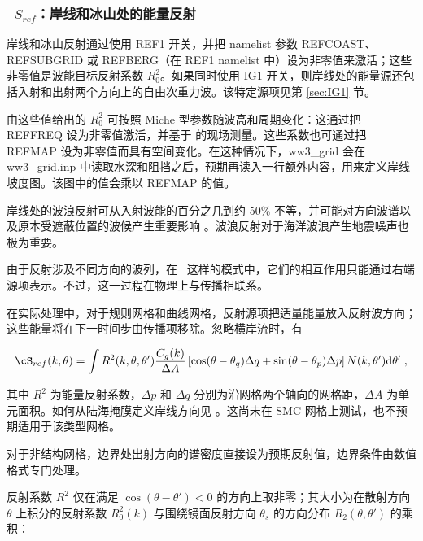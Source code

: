 \vsssub
\subsubsection{~$S_{ref}$：岸线和冰山处的能量反射} \label{sec:REF1}
\vsssub


\noindent 
岸线和冰山反射通过使用 {\code REF1} 开关，并把 namelist 参数 {\code REFCOAST}、{\code REFSUBGRID} 或 {\code REFBERG}（在 {\F REF1} namelist 中）设为非零值来激活；这些非零值是波能目标反射系数 $R_0^2$。如果同时使用 {\code IG1} 开关，则岸线处的能量源还包括入射和出射两个方向上的自由次重力波。该特定源项见第 \ref{sec:IG1} 节。

由这些值给出的 $R_0^2$ 可按照 Miche 型参数随波高和周期变化：这通过把 {\code REFFREQ} 设为非零值激活，并基于 \cite{art:EHG94} 的现场测量。这些系数也可通过把 {\code REFMAP} 设为非零值而具有空间变化。在这种情况下，ww3\_grid 会在 ww3\_grid.inp 中读取水深和阻挡之后，预期再读入一行额外内容，用来定义岸线坡度图。该图中的值会乘以 {\code REFMAP} 的值。

岸线处的波浪反射可从入射波能的百分之几到约 50\% 不等，并可能对方向波谱以及原本受遮蔽位置的波候产生重要影响 \citep{pro:ORe99}。波浪反射对于海洋波浪产生地震噪声也极为重要。

由于反射涉及不同方向的波列，在 \ws\ 这样的模式中，它们的相互作用只能通过右端源项表示。不过，这一过程在物理上与传播相联系。

在实际处理中，对于规则网格和曲线网格，反射源项把适量能量放入反射波方向；这些能量将在下一时间步由传播项移除。忽略横岸流时，有

\begin{equation} 
\cS_{ref}(k,\theta) = 
\int R^2(k,\theta,\theta') \frac{C_g(k)}{\Delta A} \left[\cos (\theta-\theta_q) \Delta q + \sin (\theta-\theta_p)  \Delta p \right] N(k,\theta') \mathrm{d} \theta' \; ,
\end{equation}

\noindent
其中 $R^2$ 为能量反射系数，$\Delta p$ 和 $\Delta q$ 分别为沿网格两个轴向的网格距，$\Delta A$ 为单元面积。如何从陆海掩膜定义岸线方向见 \cite{art:Aea11}。这尚未在 SMC 网格上测试，也不预期适用于该类型网格。

对于非结构网格，边界处出射方向的谱密度直接设为预期反射值，边界条件由数值格式专门处理。


反射系数 $R^2$ 仅在满足 $\cos(\theta-\theta')<0$ 的方向上取非零；其大小为在散射方向 $\theta$ 上积分的反射系数 $R_0^2(k)$ 与围绕镜面反射方向 $\theta_s$ 的方向分布 $R_2(\theta,\theta')$ 的乘积：


